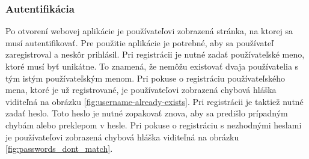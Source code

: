 \subsubsection{Autentifikácia}
\indent \indent Po otvorení webovej aplikácie je používateľovi zobrazená stránka, na ktorej sa musí autentifikovať. Pre použitie aplikácie je potrebné, aby sa používateľ zaregistroval a neskôr prihlásil. Pri registrácii je nutné zadať používateľské meno, ktoré musí byť unikátne. To znamená, že nemôžu existovať dvaja používatelia s tým istým používateľským menom. Pri pokuse o registráciu používateľského mena, ktoré je už registrované, je používateľovi zobrazená chybová hláška viditeľná na obrázku \ref{fig:username-already-exists}. Pri registrácii je taktiež nutné zadať heslo. Toto heslo je nutné zopakovať znova, aby sa predišlo prípadným chybám alebo preklepom v hesle. Pri pokuse o registráciu s nezhodnými heslami je používateľovi zobrazená chybová hláška viditeľná na obrázku \ref{fig:passwords_dont_match}.

